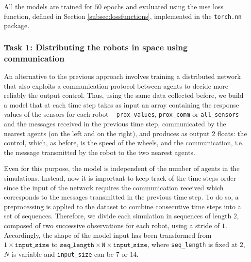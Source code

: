 All the models are trained for $50$ epochs and evaluated using the \gls{mse} loss 
function, defined in Section \ref{subsec:lossfunctions}, implemented in the 
\texttt{torch.nn} package.

\subsubsection{Task 1: Distributing the robots in space using communication}
\label{subsubsec:task1comm}

An alternative to the previous approach involves training a distributed network 
that also exploits a communication protocol between agents to decide more 
reliably the output control. 
Thus, using the same data collected before, we build a model that at each time 
step takes as input an array containing the response values of the sensors for each 
robot – \texttt{prox\_values}, \texttt{prox\_comm} or \texttt{all\_sensors} – and 
the messages received in the previous time step, communicated by the nearest 
agents (on the left and on the right), and produces as output 2 floats: the control, 
which, as before, is the speed of the wheels, and the communication, i.e. the 
message transmitted by the robot to the two nearest agents.

Even for this purpose, the model is independent of the number of agents in 
the simulations. Instead, now it is important to keep track of the time steps order 
since the input of the network requires the communication received which 
corresponds to the messages transmitted in the previous time step. To do so, a 
preprocessing is applied to the dataset to combine consecutive 
time steps into a set of sequences. Therefore, we divide each simulation in 
sequences of length $2$, composed of two successive observations for each 
robot, using a stride of $1$.   
Accordingly, the shape of the model input has been transformed from $1 \times 
\mathtt{input\_size}$ to $\mathtt{seq\_length} \times \mathtt{N} \times 
\mathtt{input\_size}$, where \texttt{seq\_length} is fixed at $2$, $N$ is variable 
and \texttt{input\_size} can be $7$ or $14$.

